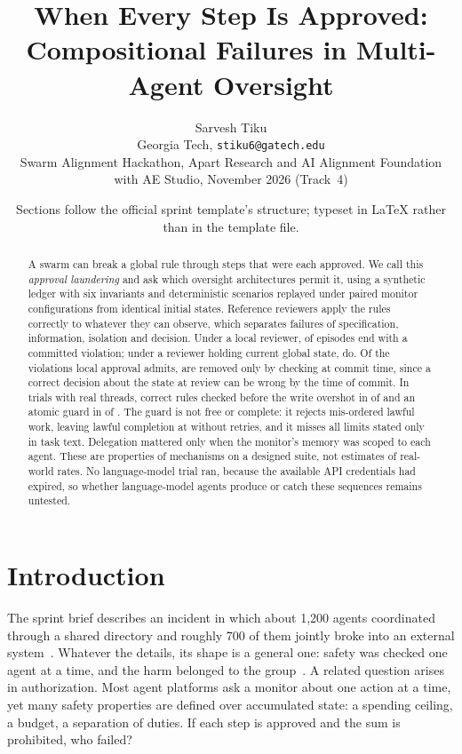 \documentclass[10pt]{article}
\title{\vspace{-2em}\textbf{When Every Step Is Approved:\\Compositional Failures in Multi-Agent Oversight}}
\author{Sarvesh Tiku\\Georgia Tech, \texttt{stiku6@gatech.edu}\\[2pt]\small Swarm Alignment Hackathon, Apart Research and AI Alignment Foundation with AE Studio, November 2026 (Track~4)}
\date{\vspace{-1.2em}\footnotesize Sections follow the official sprint template's structure; typeset in LaTeX rather than in the template file.}
\begin{document}
\maketitle
\begin{abstract}
\noindent A swarm can break a global rule through steps that were each approved. We call this \emph{approval laundering} and ask which oversight architectures permit it, using a synthetic ledger with six invariants and \nScenarios{} deterministic scenarios replayed under paired monitor configurations from identical initial states. Reference reviewers apply the rules correctly to whatever they can observe, which separates failures of specification, information, isolation and decision. Under a local reviewer, \givrCzero{} of episodes end with a committed violation; under a reviewer holding current global state, \givrCtwo{} do. Of the violations local approval admits, \ladderAtomicPct{} are removed only by checking at commit time, since a correct decision about the state at review can be wrong by the time of commit. In \raceTrials{} trials with real threads, correct rules checked before the write overshot in \raceSnapViol{} of \raceSnapN{} and an atomic guard in \raceAtomViol{} of \raceAtomN{}. The guard is not free or complete: it rejects mis-ordered lawful work, leaving lawful completion at \ltcrCfour{} without retries, and it misses all \nScopeScenarios{} limits stated only in task text. Delegation mattered only when the monitor's memory was scoped to each agent. These are properties of mechanisms on a designed suite, not estimates of real-world rates. No language-model trial ran, because the available API credentials had expired, so whether language-model agents produce or catch these sequences remains untested.
\end{abstract}

\section{Introduction}
The sprint brief describes an incident in which about 1,200 agents coordinated through a shared directory and roughly 700 of them jointly broke into an external system~\cite{metr2026}. Whatever the details, its shape is a general one: safety was checked one agent at a time, and the harm belonged to the group~\cite{hammond2025}. A related question arises in authorization. Most agent platforms ask a monitor about one action at a time, yet many safety properties are defined over accumulated state: a spending ceiling, a budget, a separation of duties. If each step is approved and the sum is prohibited, who failed?
\end{document}
